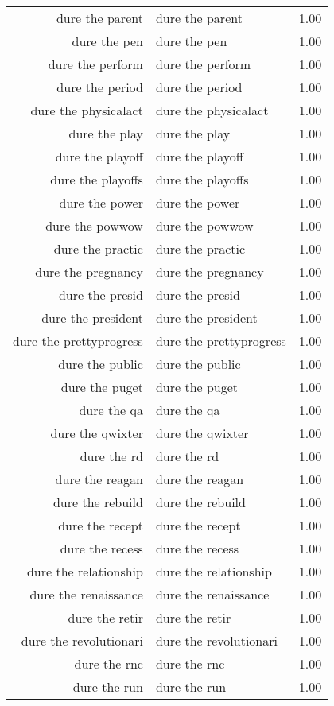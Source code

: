 \begin{table}[ht]
\begin{tabular}{rlr}
  dure the parent & dure the parent & 1.00 \\ 
  dure the pen & dure the pen & 1.00 \\ 
  dure the perform & dure the perform & 1.00 \\ 
  dure the period & dure the period & 1.00 \\ 
  dure the physicalact & dure the physicalact & 1.00 \\ 
  dure the play & dure the play & 1.00 \\ 
  dure the playoff & dure the playoff & 1.00 \\ 
  dure the playoffs & dure the playoffs & 1.00 \\ 
  dure the power & dure the power & 1.00 \\ 
  dure the powwow & dure the powwow & 1.00 \\ 
  dure the practic & dure the practic & 1.00 \\ 
  dure the pregnancy & dure the pregnancy & 1.00 \\ 
  dure the presid & dure the presid & 1.00 \\ 
  dure the president & dure the president & 1.00 \\ 
  dure the prettyprogress & dure the prettyprogress & 1.00 \\ 
  dure the public & dure the public & 1.00 \\ 
  dure the puget & dure the puget & 1.00 \\ 
  dure the qa & dure the qa & 1.00 \\ 
  dure the qwixter & dure the qwixter & 1.00 \\ 
  dure the rd & dure the rd & 1.00 \\ 
  dure the reagan & dure the reagan & 1.00 \\ 
  dure the rebuild & dure the rebuild & 1.00 \\ 
  dure the recept & dure the recept & 1.00 \\ 
  dure the recess & dure the recess & 1.00 \\ 
  dure the relationship & dure the relationship & 1.00 \\ 
  dure the renaissance & dure the renaissance & 1.00 \\ 
  dure the retir & dure the retir & 1.00 \\ 
  dure the revolutionari & dure the revolutionari & 1.00 \\ 
  dure the rnc & dure the rnc & 1.00 \\ 
  dure the run & dure the run & 1.00 \\ 

\end{tabular}
\end{table}
